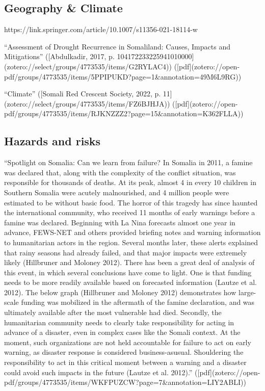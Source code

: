 {\subsection{Geography & Climate}

https://link.springer.com/article/10.1007/s11356-021-18114-w

“Assessment of Drought Recurrence in Somaliland: Causes, Impacts and Mitigations” ([Abdulkadir, 2017, p. 104172233225941010000](zotero://select/groups/4773535/items/G2RYLAC4)) ([pdf](zotero://open-pdf/groups/4773535/items/5PPIPUKD?page=1&annotation=49M6L9RG))

“Climate” ([Somali Red Crescent Society, 2022, p. 11](zotero://select/groups/4773535/items/FZ6BJHJA)) ([pdf](zotero://open-pdf/groups/4773535/items/RJKNZZZ2?page=15&annotation=K362FLLA))

\subsection{Hazards and risks}

“Spotlight on Somalia: Can we learn from failure? In Somalia in 2011, a famine was declared that, along with the complexity of the conflict situation, was responsible for thousands of deaths. At its peak, almost 4 in every 10 children in Southern Somalia were acutely malnourished, and 4 million people were estimated to be without basic food. The horror of this tragedy has since haunted the international community, who received 11 months of early warnings before a famine was declared. Beginning with La Nina forecasts almost one year in advance, FEWS-NET and others provided briefing notes and warning information to humanitarian actors in the region. Several months later, these alerts explained that rainy seasons had already failed, and that major impacts were extremely likely (Hillbruner and Moloney 2012). There has been a great deal of analysis of this event, in which several conclusions have come to light. One is that funding needs to be more readily available based on forecasted information (Lautze et al. 2012). The below graph (Hillbruner and Moloney 2012) demonstrates how large-scale funding was mobilized in the aftermath of the famine declaration, and was ultimately available after the most vulnerable had died. Secondly, the humanitarian community needs to clearly take responsibility for acting in advance of a disaster, even in complex cases like the Somali context. At the moment, such organizations are not held accountable for failure to act on early warning, as disaster response is considered business-asusual. Shouldering the responsibility to act in this critical moment between a warning and a disaster could avoid such impacts in the future (Lautze et al. 2012).” ([pdf](zotero://open-pdf/groups/4773535/items/WKFPUZCW?page=7&annotation=LIY2ABLI))

}
